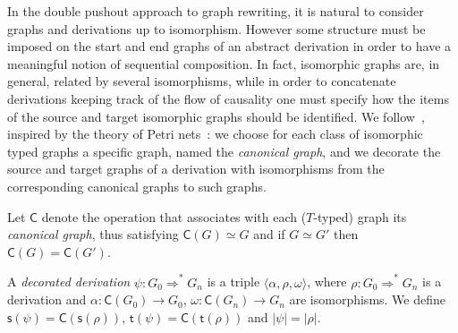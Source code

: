 \documentclass[conference]{IEEEtran}
\newcommand{\Rrel}[1]   {\stackrel{{#1}}{\Longrightarrow}}
\newcommand{\can}[1]{\ensuremath{\mathsf{C}({#1})}}
\newcommand{\source}[1]{\ensuremath{\mathsf{s}({#1})}}
\newcommand{\target}[1]{\ensuremath{\mathsf{t}({#1})}}
\begin{document}
In the double pushout approach to graph rewriting, it is natural to
consider graphs and derivations up to isomorphism.
%
However some structure must be imposed on the start and end graphs
of an abstract derivation in order to have a meaningful notion of
sequential composition.
%
In fact, isomorphic graphs are, in general, related by several
isomorphisms, while in order to concatenate derivations keeping track
of the flow of causality one must specify how the items of the source
and target isomorphic graphs should be identified.
%
We follow~\cite{Handbook}, inspired by the theory of
Petri nets~\cite{DMM:AANCP}: we choose for each class of isomorphic
typed graphs a specific graph, named the \emph{canonical graph}, and we
decorate the source and target graphs of a derivation with
isomorphisms from the corresponding canonical graphs to such
graphs.



Let $\mathsf{C}$ denote the operation that associates with each ($T$-typed)
graph its \emph{canonical graph}, thus satisfying $\can{G} \simeq G$
and if $G \simeq G'$ then $\can{G} = \can{G'}$.
%

\begin{definition}
  A \emph{decorated derivation} $\psi : G_0 \Rrel{}^* G_n$ is a
  triple $\langle \alpha, \rho, \omega \rangle$, where $\rho : G_0 \Rrel{}^*
  G_n$ is a derivation and $\alpha: \can{G_0} \to G_0$, $\omega: \can{G_n} \to
  G_n$ are isomorphisms. 
  We define $\source{\psi} = \can{\source{\rho}}$, $\target{\psi} =
  \can{\target{\rho}}$ and $|\psi| =|\rho|$.
\end{definition}

\end{document}
